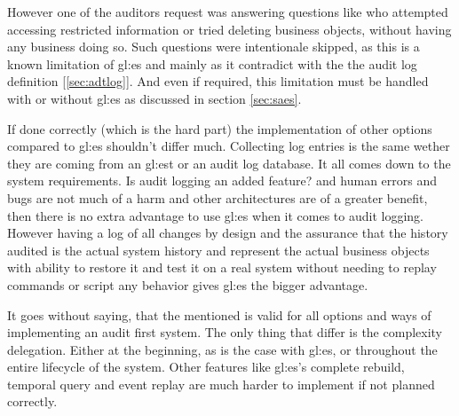 However one of the auditors request was answering questions like who attempted accessing restricted information or tried deleting business objects, without having any business doing so. Such questions were intentionale skipped, as this is a known limitation of \gls{gl:es} and mainly as it contradict with the the audit log definition [\ref{sec:adtlog}]. And even if required, this limitation must be handled with or without \gls{gl:es} as discussed in section \ref{sec:saes}.

If done correctly (which is the hard part) the implementation of other options compared to \gls{gl:es} shouldn't differ much. Collecting log entries is the same wether they are coming from an \gls{gl:est} or an audit log database. It all comes down to the system requirements. Is audit logging an added feature? and human errors and bugs are not much of a harm and other architectures are of a greater benefit, then there is no extra advantage to use \gls{gl:es} when it comes to audit logging. However having a log of all changes by design and the assurance that the history audited is the actual system history and represent the actual business objects with ability to restore it and test it on a real system without needing to replay commands or script any behavior gives \gls{gl:es} the bigger advantage. 

It goes without saying, that the mentioned is valid for all options and ways of implementing an audit first system. The only thing that differ is the complexity delegation. Either at the beginning, as is the case with \gls{gl:es}, or throughout the entire lifecycle of the system. Other features like \gls{gl:es}'s complete rebuild, temporal query and event replay are much harder to implement if not planned correctly.